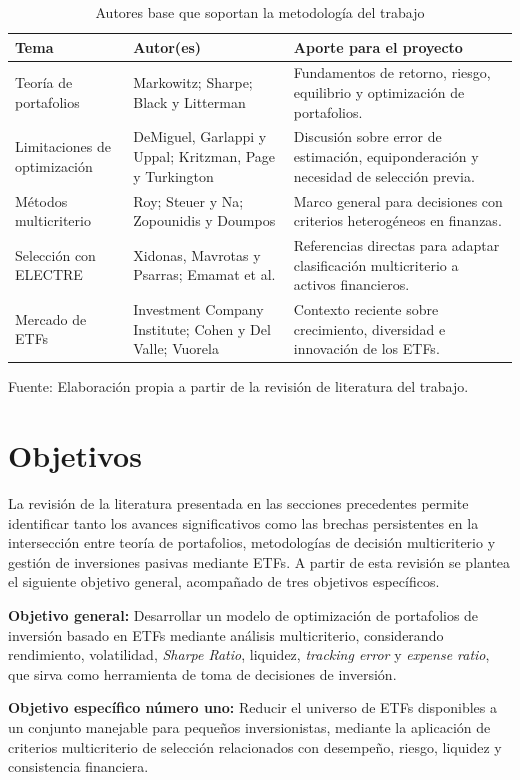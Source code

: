 \documentclass[12pt,letterpaper]{article}
\newcommand{\fuente}[1]{\begin{center}\small Fuente: #1\end{center}}
\begin{document}
\begin{longtable}{p{3.2cm}p{3.2cm}p{6.4cm}}
\caption{Autores base que soportan la metodología del trabajo}\label{tab:literatura_base}\\
\toprule
\textbf{Tema} & \textbf{Autor(es)} & \textbf{Aporte para el proyecto} \\
\midrule
Teoría de portafolios & Markowitz; Sharpe; Black y Litterman & Fundamentos de retorno, riesgo, equilibrio y optimización de portafolios. \\
Limitaciones de optimización & DeMiguel, Garlappi y Uppal; Kritzman, Page y Turkington & Discusión sobre error de estimación, equiponderación y necesidad de selección previa. \\
Métodos multicriterio & Roy; Steuer y Na; Zopounidis y Doumpos & Marco general para decisiones con criterios heterogéneos en finanzas. \\
Selección con ELECTRE & Xidonas, Mavrotas y Psarras; Emamat et al. & Referencias directas para adaptar clasificación multicriterio a activos financieros. \\
Mercado de ETFs & Investment Company Institute; Cohen y Del Valle; Vuorela & Contexto reciente sobre crecimiento, diversidad e innovación de los ETFs. \\
\bottomrule
\end{longtable}
\fuente{Elaboración propia a partir de la revisión de literatura del trabajo.}

\clearpage
\section{Objetivos}

La revisión de la literatura presentada en las secciones precedentes permite identificar tanto los avances significativos como las brechas persistentes en la intersección entre teoría de portafolios, metodologías de decisión multicriterio y gestión de inversiones pasivas mediante ETFs. A partir de esta revisión se plantea el siguiente objetivo general, acompañado de tres objetivos específicos.

\textbf{Objetivo general:} Desarrollar un modelo de optimización de portafolios de inversión basado en ETFs mediante análisis multicriterio, considerando rendimiento, volatilidad, \textit{Sharpe Ratio}, liquidez, \textit{tracking error} y \textit{expense ratio}, que sirva como herramienta de toma de decisiones de inversión.

\textbf{Objetivo específico número uno:} Reducir el universo de ETFs disponibles a un conjunto manejable para pequeños inversionistas, mediante la aplicación de criterios multicriterio de selección relacionados con desempeño, riesgo, liquidez y consistencia financiera.
\end{document}
